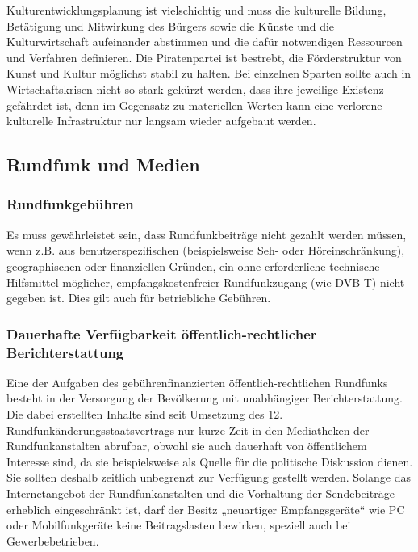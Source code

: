 Kulturentwicklungsplanung ist vielschichtig und muss die kulturelle Bildung, Betätigung und Mitwirkung des Bürgers sowie die Künste und die Kulturwirtschaft aufeinander abstimmen und die dafür notwendigen Ressourcen und Verfahren definieren. Die Piratenpartei ist bestrebt, die Förderstruktur von Kunst und Kultur möglichst stabil zu halten. Bei einzelnen Sparten sollte auch in Wirtschaftskrisen nicht so stark gekürzt werden, dass ihre jeweilige Existenz gefährdet ist, denn im Gegensatz zu materiellen Werten kann eine verlorene kulturelle Infrastruktur nur langsam wieder aufgebaut werden.

\subsection{Rundfunk und Medien}

\subsubsection{Rundfunkgebühren}

Es muss gewährleistet sein, dass Rundfunkbeiträge nicht gezahlt werden müssen, wenn z.B. aus benutzerspezifischen (beispielsweise Seh- oder Höreinschränkung), geographischen oder finanziellen Gründen, ein ohne erforderliche technische Hilfsmittel möglicher, empfangskostenfreier Rundfunkzugang (wie DVB-T) nicht gegeben ist. Dies gilt auch für betriebliche Gebühren.

\subsubsection{Dauerhafte Verfügbarkeit öffentlich-rechtlicher Berichterstattung}

Eine der Aufgaben des gebührenfinanzierten öffentlich-rechtlichen Rundfunks besteht in der Versorgung der Bevölkerung mit unabhängiger Berichterstattung. Die dabei erstellten Inhalte sind seit Umsetzung des 12. Rundfunkänderungsstaatsvertrags nur kurze Zeit in den Mediatheken der Rundfunkanstalten abrufbar, obwohl sie auch dauerhaft von öffentlichem Interesse sind, da sie beispielsweise als Quelle für die politische Diskussion dienen. Sie sollten deshalb zeitlich unbegrenzt zur Verfügung gestellt werden. Solange das Internetangebot der Rundfunkanstalten und die Vorhaltung der Sendebeiträge erheblich eingeschränkt ist, darf der Besitz „neuartiger Empfangsgeräte`` wie PC oder Mobilfunkgeräte keine Beitragslasten bewirken, speziell auch bei Gewerbebetrieben.

